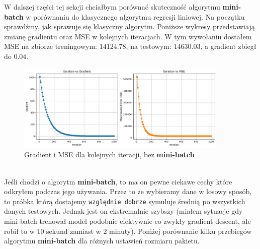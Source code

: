 \documentclass[polish,12pt,a4paper]{extarticle}
\begin{document}
W dalszej części tej sekcji chciałbym porównać skuteczność algorytmu \textbf{mini-batch} w porównaniu do klasycznego algorytmu regresji liniowej. Na początku sprawdźmy, jak sprawuje się klasyczny algorytm. Poniższe wykresy przedstawiają zmianę gradientu oraz MSE w kolejnych iteracjach. W tym wywołaniu dostałem MSE na zbiorze treningowym: $14124.78$, na testowym: $14630.03$, a gradient zbiegł do $0.04$.
\begin{figure}
    \centering
    \includegraphics[width=0.9\textwidth]{data/itgradnormal.png}
    \caption{Gradient i MSE dla kolejnych iteracji, bez \textbf{mini-batch}}
\end{figure} \\
Jeśli chodzi o algorytm \textbf{mini-batch}, to ma on pewne ciekawe cechy które odkryłem podczas jego używania. Przez to że wybieramy dane w losowy sposób, to próbka którą dostajemy \texttt{względnie dobrze} symuluje średnią po wszystkich danych testowych. Jednak jest on ekstremalnie szybszy (miałem sytuacje gdy mini-batch trenował model podobnie efektywnie co zwykły gradient descent, ale robił to w $10$ sekund zamiast w $2$ minuty). Poniżej porównanie kilku przebiegów algorytmu \textbf{mini-batch} dla różnych ustawień rozmiaru pakietu.
\end{document}
